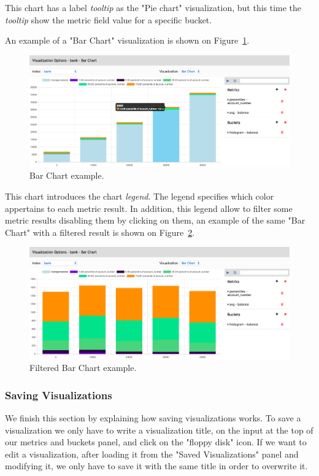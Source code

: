 \documentclass[a4paper, 12pt, english]{book}
\begin{document}
This chart has a label \textit{tooltip} as the "Pie chart" visualization, but this time the \textit{tooltip} show the metric field value for a specific bucket.

An example of a "Bar Chart" visualization is shown on Figure~\ref{fig:bar-chart-calculation}.
\begin{figure}
  \centering
  \includegraphics[width=16cm, keepaspectratio]{img/bar-chart-calculation.png}
  \caption{Bar Chart example.}
  \label{fig:bar-chart-calculation}
\end{figure}

This chart introduces the chart \textit{legend}. The legend specifies which color appertains to each metric result. In addition, this legend allow to filter some metric results disabling them by clicking on them, an example of the same "Bar Chart" with a filtered result is shown on Figure~\ref{fig:bar-chart-lengend-filter-example}.
\begin{figure}
  \centering
  \includegraphics[width=16cm, keepaspectratio]{img/bar-chart-lengend-filter-example.png}
  \caption{Filtered Bar Chart example.}
  \label{fig:bar-chart-lengend-filter-example}
\end{figure}

\subsubsection{Saving Visualizations}
\label{sec:saving-visualizations}
We finish this section by explaining how saving visualizations works. To save a visualization we only have to write a visualization title, on the input at the top of our metrics and buckets panel, and click on the "floppy disk" icon. If we want to edit a visualization, after loading it from the "Saved Visualizations" panel and modifying it, we only have to save it with the same title in order to overwrite it.
\end{document}
